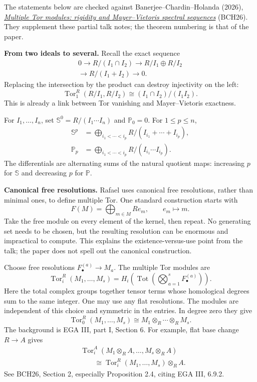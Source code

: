 The statements below are checked against
Banerjee--Chardin--Holanda (2026),
\href{https://arxiv.org/abs/2604.20646}{%
\emph{Multiple Tor modules: rigidity and
Mayer--Vietoris spectral sequences}}
(BCH26). They supplement these partial
talk notes; the theorem numbering is
that of the paper.

\medskip\noindent
\textbf{From two ideals to several.}
Recall the exact sequence
$$
\begin{gathered}
0\longrightarrow R/(I_1\cap I_2)
\longrightarrow R/I_1\oplus R/I_2\\
\longrightarrow R/(I_1+I_2)
\longrightarrow0.
\end{gathered}
$$
Replacing the intersection by the product
can destroy injectivity on the left:
$$
\operatorname{Tor}_1^R(R/I_1,R/I_2)
\cong (I_1\cap I_2)/(I_1I_2).
$$
This is already a link between Tor
vanishing and Mayer--Vietoris exactness.

For $I_1,\ldots,I_n$, set
$\mathbb{S}^0=R/(I_1\cdots I_n)$ and
$\mathbb{P}_0=0$. For $1\leq p\leq n$,
$$
\begin{aligned}
\mathbb{S}^p
&=\bigoplus_{i_1<\cdots<i_p}
R/(I_{i_1}+\cdots+I_{i_p}),\\
\mathbb{P}_p
&=\bigoplus_{i_1<\cdots<i_p}
R/(I_{i_1}\cdots I_{i_p}).
\end{aligned}
$$
The differentials are alternating sums
of the natural quotient maps: increasing
$p$ for $\mathbb{S}$ and decreasing $p$
for $\mathbb{P}$.

\medskip\noindent
\textbf{Canonical free resolutions.}
Rafael uses canonical free resolutions,
rather than minimal ones, to define
multiple Tor. One standard construction
starts with
$$
F(M)=\bigoplus_{m\in M}Re_m,
\qquad e_m\longmapsto m.
$$
Take the free module on every element
of the kernel, then repeat.
No generating set needs to be chosen,
but the resulting resolution can be
enormous and impractical to compute.
This explains the existence-versus-use
point from the talk; the paper does not
spell out the canonical construction.

Choose free resolutions
$F^{(a)}_\bullet\longrightarrow M_a$.
The multiple Tor modules are
$$
\operatorname{Tor}_i^R(M_1,\ldots,M_s)
=H_i\!\left(\operatorname{Tot}
\left(\bigotimes_{a=1}^s
F^{(a)}_\bullet\right)\right).
$$
Here the total complex groups together
tensor terms whose homological degrees
sum to the same integer.
One may use any flat resolutions.
The modules are independent of this
choice and symmetric in the entries.
In degree zero they give
$$
\operatorname{Tor}_0^R(M_1,\ldots,M_s)
\cong M_1\otimes_R\cdots\otimes_R M_s.
$$
The background is EGA III, part I,
Section 6. For example, flat base change
$R\longrightarrow A$ gives
$$
\begin{aligned}
&\operatorname{Tor}_i^A
(M_1\otimes_R A,\ldots,M_s\otimes_R A)\\
&\qquad\cong
\operatorname{Tor}_i^R(M_1,\ldots,M_s)
\otimes_R A.
\end{aligned}
$$
See BCH26, Section 2, especially
Proposition 2.4, citing EGA III, 6.9.2.

